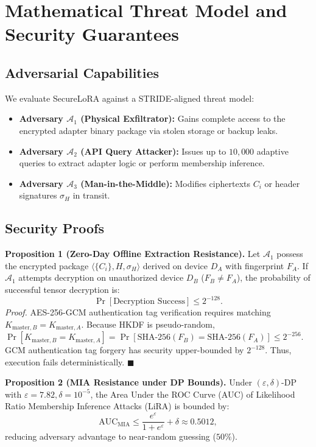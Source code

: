 \documentclass[10pt,conference,compsocconf]{IEEEtran}
\begin{document}
\section{Mathematical Threat Model and Security Guarantees}
\label{sec:threat_model}

\subsection{Adversarial Capabilities}
We evaluate SecureLoRA against a STRIDE-aligned threat model:
\begin{itemize}
    \item \textbf{Adversary $\mathcal{A}_1$ (Physical Exfiltrator):} Gains complete access to the encrypted adapter binary package via stolen storage or backup leaks.
    \item \textbf{Adversary $\mathcal{A}_2$ (API Query Attacker):} Issues up to $10,000$ adaptive queries to extract adapter logic or perform membership inference.
    \item \textbf{Adversary $\mathcal{A}_3$ (Man-in-the-Middle):} Modifies ciphertexts $C_i$ or header signatures $\sigma_H$ in transit.
\end{itemize}

\subsection{Security Proofs}
\textbf{Proposition 1 (Zero-Day Offline Extraction Resistance).}
Let $\mathcal{A}_1$ possess the encrypted package $\langle \{C_i\}, H, \sigma_H \rangle$ derived on device $D_A$ with fingerprint $F_A$. If $\mathcal{A}_1$ attempts decryption on unauthorized device $D_B$ ($F_B \neq F_A$), the probability of successful tensor decryption is:
\begin{equation}
\Pr[\text{Decryption Success}] \le 2^{-128}.
\end{equation}
\textit{Proof.} AES-256-GCM authentication tag verification requires matching $K_{\text{master}, B} = K_{\text{master}, A}$. Because HKDF is pseudo-random, $\Pr[K_{\text{master}, B} = K_{\text{master}, A}] = \Pr[\text{SHA-256}(F_B) = \text{SHA-256}(F_A)] \le 2^{-256}$. GCM authentication tag forgery has security upper-bounded by $2^{-128}$. Thus, execution fails deterministically. $\blacksquare$

\textbf{Proposition 2 (MIA Resistance under DP Bounds).}
Under $(\varepsilon, \delta)$-DP with $\varepsilon = 7.82, \delta = 10^{-5}$, the Area Under the ROC Curve (AUC) of Likelihood Ratio Membership Inference Attacks (LiRA) is bounded by:
\begin{equation}
\text{AUC}_{\text{MIA}} \le \frac{e^\varepsilon}{1 + e^\varepsilon} + \delta \approx 0.5012,
\end{equation}
reducing adversary advantage to near-random guessing ($50\%$).
\end{document}
